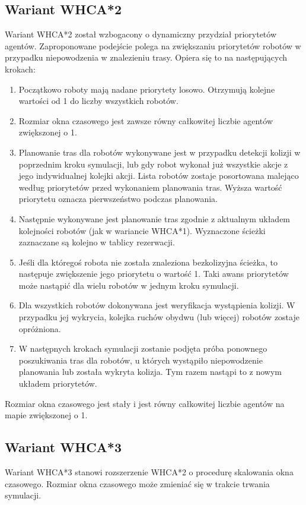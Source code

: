 
\subsection{Wariant WHCA*2}
Wariant WHCA*2 został wzbogacony o dynamiczny przydział priorytetów agentów.
Zaproponowane podejście polega na zwiększaniu priorytetów robotów w przypadku niepowodzenia w znalezieniu trasy.
Opiera się to na następujących krokach:
\begin{enumerate}
	\item Początkowo roboty mają nadane priorytety losowo. Otrzymują kolejne wartości od 1 do liczby wszystkich robotów.
	\item Rozmiar okna czasowego jest zawsze równy całkowitej liczbie agentów zwiększonej o 1.
	\item Planowanie tras dla robotów wykonywane jest w przypadku detekcji kolizji w poprzednim kroku symulacji, lub gdy robot wykonał już wszystkie akcje z jego indywidualnej kolejki akcji.
	Lista robotów zostaje posortowana malejąco według priorytetów przed wykonaniem planowania tras. Wyższa wartość priorytetu oznacza pierwszeństwo podczas planowania.
	\item Następnie wykonywane jest planowanie tras zgodnie z aktualnym układem kolejności robotów (jak w wariancie WHCA*1). Wyznaczone ścieżki zaznaczane są kolejno w tablicy rezerwacji.
	\item Jeśli dla któregoś robota nie została znaleziona bezkolizyjna ścieżka, to następuje zwiększenie jego priorytetu o wartość 1. Taki awans priorytetów może nastąpić dla wielu robotów w jednym kroku symulacji.
	\item Dla wszystkich robotów dokonywana jest weryfikacja wystąpienia kolizji. W przypadku jej wykrycia, kolejka ruchów obydwu (lub więcej) robotów zostaje opróżniona.
	\item W następnych krokach symulacji zostanie podjęta próba ponownego poszukiwania tras dla robotów, u których wystąpiło niepowodzenie planowania lub została wykryta kolizja. Tym razem nastąpi to z nowym układem priorytetów.
\end{enumerate}

Rozmiar okna czasowego jest stały i jest równy całkowitej liczbie agentów na mapie zwiększonej o 1.

\subsection{Wariant WHCA*3}
Wariant WHCA*3 stanowi rozszerzenie WHCA*2 o procedurę skalowania okna czasowego.
Rozmiar okna czasowego może zmieniać się w trakcie trwania symulacji.

